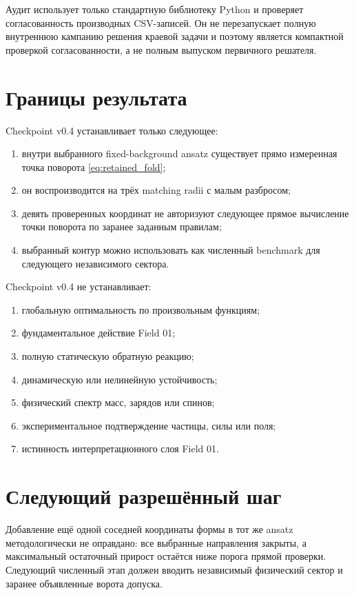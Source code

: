 \documentclass[11pt,a4paper]{article}
\begin{document}
Аудит использует только стандартную библиотеку Python и проверяет согласованность производных CSV-записей. Он не перезапускает полную внутреннюю кампанию решения краевой задачи и поэтому является компактной проверкой согласованности, а не полным выпуском первичного решателя.

\section{Границы результата}

Checkpoint v0.4 устанавливает только следующее:
\begin{enumerate}
\item внутри выбранного fixed-background ansatz существует прямо измеренная точка поворота \eqref{eq:retained_fold};
\item он воспроизводится на трёх matching radii с малым разбросом;
\item девять проверенных координат не авторизуют следующее прямое вычисление точки поворота по заранее заданным правилам;
\item выбранный контур можно использовать как численный benchmark для следующего независимого сектора.
\end{enumerate}

Checkpoint v0.4 не устанавливает:
\begin{enumerate}
\item глобальную оптимальность по произвольным функциям;
\item фундаментальное действие Field 01;
\item полную статическую обратную реакцию;
\item динамическую или нелинейную устойчивость;
\item физический спектр масс, зарядов или спинов;
\item экспериментальное подтверждение частицы, силы или поля;
\item истинность интерпретационного слоя Field 01.
\end{enumerate}

\section{Следующий разрешённый шаг}

Добавление ещё одной соседней координаты формы в тот же ansatz методологически не оправдано: все выбранные направления закрыты, а максимальный остаточный прирост остаётся ниже порога прямой проверки. Следующий численный этап должен вводить независимый физический сектор и заранее объявленные ворота допуска.
\end{document}
